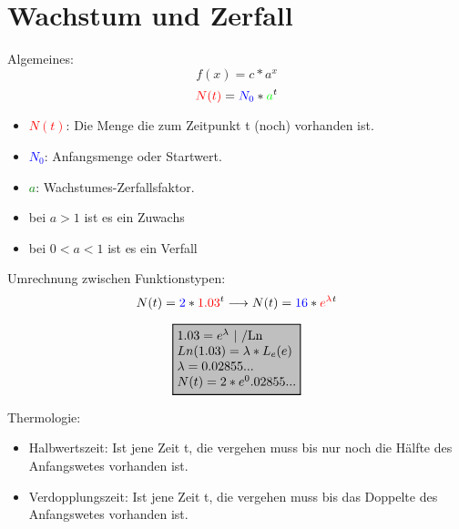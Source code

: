 \newpage
\section{Wachstum und Zerfall}


\hfill \break
Algemeines:
$$f(x) = c*a^x$$
$$\textcolor{red}{N(t)} = \textcolor{blue}{N_0}*\textcolor{green}{a}^t$$

\begin{itemize}
    \item \textcolor{red}{$N(t)$}: Die Menge die zum Zeitpunkt t (noch) vorhanden ist.
    \item \textcolor{blue}{$N_0$}: Anfangsmenge oder Startwert.
    \item \textcolor{green}{$a$}: Wachstumes-Zerfallsfaktor.
    \item bei $a>1$ ist es ein Zuwachs
    \item bei $0<a<1$ ist es ein Verfall
\end{itemize}


\hfill \break
Umrechnung zwischen Funktionstypen:
$$N(t) = \textcolor{blue}{2}*\textcolor{red}{1.03}^t  \longrightarrow  N(t) = \textcolor{blue}{16}*\textcolor{red}{e^\lambda}^t$$

$$\fboxrule=0.8pt \fcolorbox{black}{lightgray}{%
        \begin{tabular}[t]{@{}l@{}}
            $1.03 = e^\lambda$ | /Ln      \\
            $Ln(1.03) = \lambda * L_e(e)$ \\
            $\lambda = 0.02855...$        \\
            $N(t) = 2*e^0.02855...$       \\
        \end{tabular}}$$


\hfill \break
Thermologie:
\begin{itemize}
    \item Halbwertszeit: Ist jene Zeit t, die vergehen muss bis nur noch die Hälfte des Anfangswetes vorhanden ist.
    \item Verdopplungszeit: Ist jene Zeit t, die vergehen muss bis das Doppelte des Anfangswetes vorhanden ist.
\end{itemize}

\break

\break

\break

